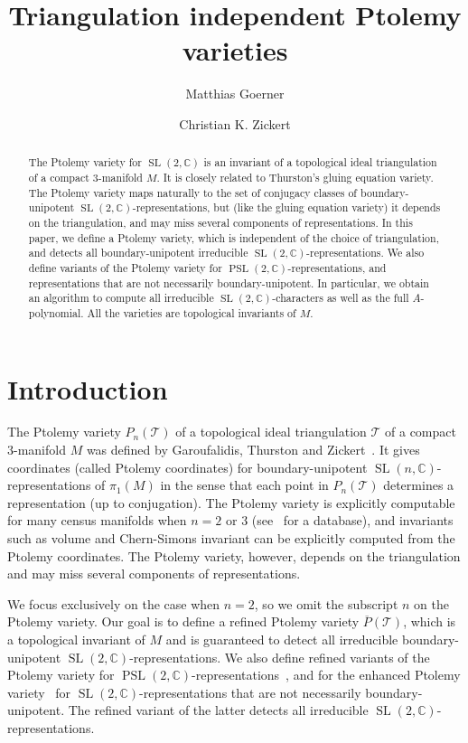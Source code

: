 \documentclass[11pt]{amsart}
\author{Matthias Goerner}
\title[Triangulation independent Ptolemy varieties]{Triangulation independent Ptolemy varieties}
\author{Christian K. Zickert}
\date{}
\theoremstyle{plain}
\theoremstyle{definition}
\numberwithin{equation}{section}
\newcommand{\C}{\mathbb C}
\newcommand{\T}{\mathcal T}
\DeclareMathOperator{\PSL}{PSL}
\DeclareMathOperator{\SL}{SL}
\begin{document}
\maketitle
\begin{abstract}
The Ptolemy variety for $\SL(2,\C)$ is an invariant of a topological ideal triangulation of a compact $3$-manifold $M$. It is closely related to Thurston's gluing equation variety. The Ptolemy variety maps naturally to the set of conjugacy classes of boundary-unipotent $\SL(2,\C)$-representations, but (like the gluing equation variety) it depends on the triangulation, and may miss several components of representations. In this paper, we define a Ptolemy variety, which is independent of the choice of triangulation, and detects all boundary-unipotent irreducible $\SL(2,\C)$-representations. We also define variants of the Ptolemy variety for $\PSL(2,\C)$-representations, and representations that are not necessarily boundary-unipotent. In particular, we obtain an algorithm to compute all irreducible $\SL(2,\C)$-characters as well as the full $A$-polynomial. All the varieties are topological invariants of $M$.
\end{abstract}
\section{Introduction}
The Ptolemy variety $P_n(\T)$ of a topological ideal triangulation $\T$ of a compact $3$-manifold $M$ was defined by Garoufalidis, Thurston and Zickert~\cite{GaroufalidisThurstonZickert}. It gives coordinates (called Ptolemy coordinates) for boundary-unipotent $\SL(n,\C)$-representations of $\pi_1(M)$ in the sense that each point in $P_n(\T)$ determines a representation (up to conjugation). The Ptolemy variety is explicitly computable for many census manifolds when $n=2$ or $3$ (see~\cite{CURVE,FalbelKoseleffRouillier} for a database), and invariants such as volume and Chern-Simons invariant can be explicitly computed from the Ptolemy coordinates. The Ptolemy variety, however, depends on the triangulation and may miss several components of representations. 

We focus exclusively on the case when $n=2$, so we omit the subscript $n$ on the Ptolemy variety. Our goal is to define a refined Ptolemy variety $\overline P(\T)$, which is a topological invariant of $M$ and is guaranteed to detect all irreducible boundary-unipotent $\SL(2,\C)$-representations. 
We also define refined variants of the Ptolemy variety for $\PSL(2,\C)$-representations~\cite{GaroufalidisThurstonZickert,PtolemyField}, and for the enhanced Ptolemy variety~\cite{ZickertEnhancedPtolemy} for $\SL(2,\C)$-representations that are not necessarily boundary-unipotent. The refined variant of the latter detects all irreducible $\SL(2,\C)$-representations. 
\end{document}
